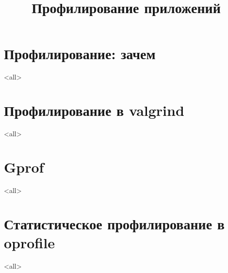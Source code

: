 

\title[Profiling]{Профилирование приложений}





\begin{frame}
	\frametitle{}
	\titlepage
	\vspace{-0.5cm}
	\begin{center}
	\end{center}
\end{frame}

\begin{frame}
	\tableofcontents
\end{frame}




\section{Профилирование: зачем}
\mode<all>{}

\section{Профилирование в valgrind}
\mode<all>{}

\section{Gprof}
\mode<all>{}

\section[oprofile]{Статистическое профилирование в oprofile}
\mode<all>{}


